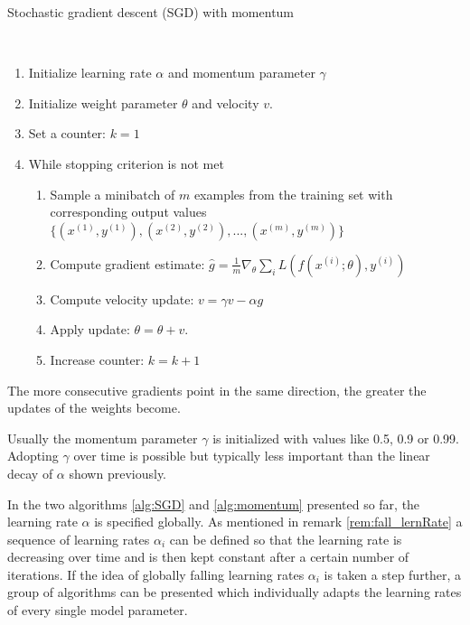\begin{algorithm}
	\caption{Stochastic gradient descent (SGD) with momentum \cite{goodfellow2016deep}}\label{alg:momentum}
	\begin{algorithmic}
		\\
		\begin{enumerate}
			\item Initialize learning rate $\alpha$ and momentum parameter $\gamma$
			\item Initialize weight parameter $\theta$ and velocity $v$.
			\item Set a counter: $k = 1$
			\item While stopping criterion is not met
			\begin{enumerate}[label=\emph{\alph*})]
				\item Sample a minibatch of $m$ examples from the training set with corresponding output values
				$\{(x^{(1)}, y^{(1)}), (x^{(2)}, y^{(2)}), ..., (x^{(m)}, y^{(m)})\}$
				\item Compute gradient estimate: $\hat{g} = \frac{1}{m} \nabla_\theta \sum_i L(f(x^{(i)};\theta), y^{(i)})$
				\item Compute velocity update: $v = \gamma v - \alpha g$
				\item Apply update: $\theta = \theta + v$.
				\item Increase counter: $k = k + 1$
			\end{enumerate}
		\end{enumerate}
	\end{algorithmic}
\end{algorithm}

\begin{remark}
	The more consecutive gradients point in the same direction, the greater the updates of the weights become. 
\end{remark}

\begin{remark}
	Usually the momentum parameter $\gamma$ is initialized with values like 0.5, 0.9 or 0.99. Adopting $\gamma$ over time is possible but typically less important than the linear decay of $\alpha$ shown previously. 
\end{remark}

In the two algorithms \ref{alg:SGD} and \ref{alg:momentum} presented so far, the learning rate $\alpha$ is specified globally. As mentioned in remark \ref{rem:fall_lernRate} a sequence of learning rates $\alpha_i$ can be defined so that the learning rate is decreasing over time and is then kept constant after a certain number of iterations. If the idea of globally falling learning rates $\alpha_i$ is taken a step further, a group of algorithms can be presented which individually adapts the learning rates of every single model parameter.

